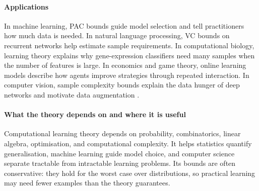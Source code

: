 \paragraph{Applications}
In machine learning, PAC bounds guide model selection and tell practitioners how much data is needed. In natural language processing, VC bounds on recurrent networks help estimate sample requirements. In computational biology, learning theory explains why gene-expression classifiers need many samples when the number of features is large. In economics and game theory, online learning models describe how agents improve strategies through repeated interaction. In computer vision, sample complexity bounds explain the data hunger of deep networks and motivate data augmentation \cite{colt_ref4}.

\paragraph{What the theory depends on and where it is useful}
Computational learning theory depends on probability, combinatorics, linear algebra, optimisation, and computational complexity. It helps statistics quantify generalisation, machine learning guide model choice, and computer science separate tractable from intractable learning problems. Its bounds are often conservative: they hold for the worst case over distributions, so practical learning may need fewer examples than the theory guarantees.

